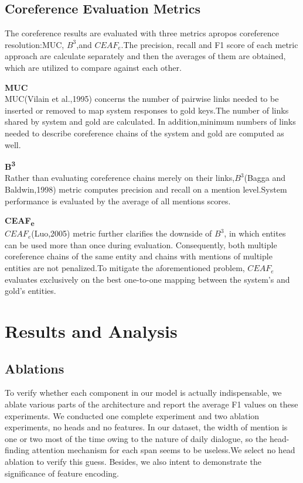 \documentclass[11pt]{article}
\begin{document}
\subsection{Coreference Evaluation Metrics}
The coreference results are evaluated with three metrics apropos coreference resolution:MUC, $B^{3}$,and $CEAF_e$.The precision, recall and F1 score of each metric approach are calculate separately and then the averages of them are obtained, which are utilized to compare against each other.

\textbf{MUC}\\
MUC(Vilain et al.,1995) concerns the number of pairwise links needed to be inserted or removed to map system responses to gold keys.The number of links shared by  system and gold are calculated. In addition,minimum numbers of links needed to describe coreference chains of the system and gold are computed as well.

\textbf{B\textsuperscript{3}} \\
Rather than evaluating coreference chains merely on their links,$B^{3}$(Bagga and Baldwin,1998) metric computes precision and recall on a mention level.System performance is evaluated by the average of all mentions scores.


\textbf{CEAF\textsubscript{e}} \\
$CEAF_e$(Luo,2005) metric further clarifies the downside of $B^{3}$, in which entites can be used more than once during evaluation. Consequently, both multiple coreference chains of the same entity and chains with mentions of multiple entities are not penalized.To mitigate the aforementioned problem, $CEAF_e$ evaluates exclusively on the best one-to-one mapping between the system’s and gold’s entities.


\section{Results and Analysis}
\subsection{Ablations}
To verify whether each component in our model is actually indispensable, we ablate various parts of the architecture and report the average F1 values on these experiments. We conducted one complete experiment and two ablation experiments, no heads and no features. In our dataset, the width of mention is one or two most of the time owing to the nature of daily dialogue, so the head-finding attention mechanism for each span seems to be useless.We select no head ablation to verify this guess. Besides, we also intent to demonstrate the significance of feature encoding.
\end{document}
